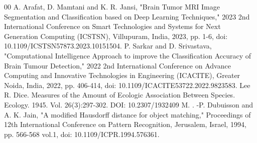 \documentclass[conference]{IEEEtran}
\begin{document}
\begin{thebibliography}{00}
A. Arafat, D. Mamtani and K. R. Jansi, "Brain Tumor MRI Image Segmentation and Classification based on Deep Learning Techniques," 2023 2nd International Conference on Smart Technologies and Systems for Next Generation Computing (ICSTSN), Villupuram, India, 2023, pp. 1-6, doi: 10.1109/ICSTSN57873.2023.10151504.
P. Sarkar and D. Srivastava, "Computational Intelligence Approach to improve the Classification Accuracy of Brain Tumour Detection," 2022 2nd International Conference on Advance Computing and Innovative Technologies in Engineering (ICACITE), Greater Noida, India, 2022, pp. 406-414, doi: 10.1109/ICACITE53722.2022.9823583.
Lee R. Dice. Measures of the Amount of Ecologic Association Between Species. Ecology. 1945. Vol. 26(3):297-302. DOI: 10.2307/1932409
M. . -P. Dubuisson and A. K. Jain, "A modified Hausdorff distance for object matching," Proceedings of 12th International Conference on Pattern Recognition, Jerusalem, Israel, 1994, pp. 566-568 vol.1, doi: 10.1109/ICPR.1994.576361.
\end{thebibliography}
\vspace{12pt}
\color{red}
\end{document}
